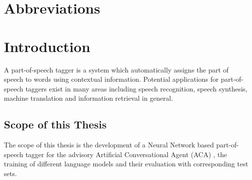 \chapter*{Abbreviations}\label{s.abbr}
\begin{acronym}[----------------]
\end{acronym}

\chapter{Introduction}\label{c.introduction}

A part-of-speech tagger is a system which automatically assigns the part of speech to words using contextual information. Potential applications for part-of-speech taggers exist in many areas including speech recognition, speech synthesis, machine translation and information retrieval in general.


\section{Scope of this Thesis}\label{c.introduction.scope}
The scope of this thesis is the development of a Neural Network based part-of-speech tagger for the advisory Artificial Conversational Agent (ACA) \Alex, the training of different language models and their evaluation with corresponding test sets.

